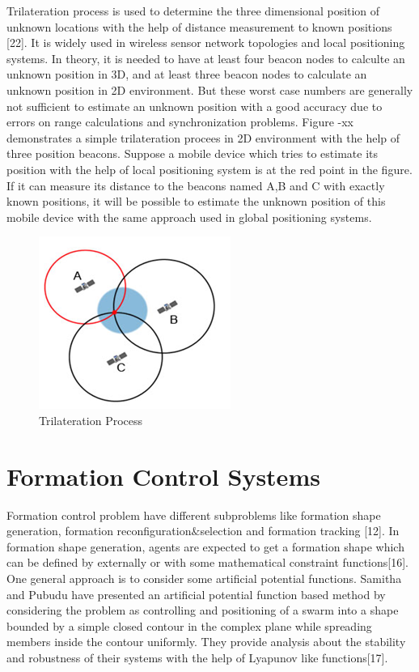 Trilateration process is used to determine the three dimensional position of unknown locations with the help of distance measurement to known positions [22].  It is widely used in wireless sensor network topologies and local positioning systems.  In theory, it is needed to have at least four beacon nodes to calculte an unknown position in 3D, and at least three beacon nodes to calculate an unknown position in 2D environment. But these worst case numbers are generally not sufficient to estimate an unknown position with a good accuracy due to errors on range calculations and synchronization problems. Figure -xx demonstrates a simple trilateration procees in 2D environment with the help of  three position beacons. Suppose a mobile device which tries to estimate its position with the help of local positioning system is at the red point in the figure. If it can measure its distance to the beacons named A,B and C with exactly known positions, it will be possible to estimate the unknown position of this mobile device with the same approach used in global positioning systems. 


\begin{figure}[H]
	\caption{Trilateration Process}
	\centering
	\includegraphics[scale = 1]{trilateration}
\end{figure}



\section{Formation Control Systems}
Formation control problem have different subproblems like formation shape generation, formation reconfiguration$\&$selection and formation tracking [12].  
In formation shape generation, agents are expected to get a formation shape which can be defined by externally or with some mathematical constraint functions[16].  One general approach is to consider some artificial potential functions. Samitha and Pubudu have presented an artificial potential function based method  by considering the problem as controlling and positioning of a swarm into a shape bounded by a simple closed contour in the complex plane while spreading members inside the contour uniformly.  They provide analysis about the stability and robustness of their systems with the help of Lyapunov like functions[17].

